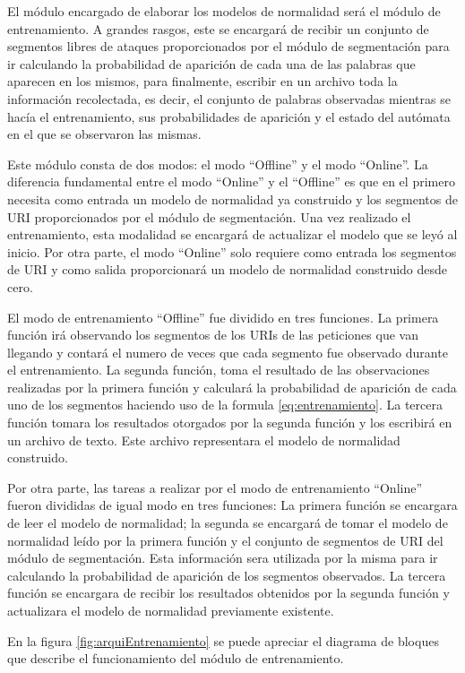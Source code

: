 El módulo encargado de elaborar los modelos de normalidad será el módulo de entrenamiento. A grandes rasgos, este se encargará de recibir un conjunto de segmentos libres de ataques proporcionados por el módulo de segmentación para ir calculando la probabilidad de aparición de cada una de las palabras que aparecen en los mismos, para finalmente, escribir en un archivo toda la información recolectada, es decir, el conjunto de palabras observadas mientras se hacía el entrenamiento, sus probabilidades de aparición y el estado del autómata en el que se observaron las mismas.

Este módulo consta de dos modos: el modo ``Offline'' y el modo ``Online''. La  diferencia fundamental entre el modo ``Online'' y el ``Offline'' es que en el primero necesita como entrada un modelo de normalidad ya construido y los segmentos de URI proporcionados por el módulo de segmentación. Una vez realizado el entrenamiento, esta modalidad se encargará de actualizar el modelo que se leyó al inicio. Por otra parte, el modo ``Online'' solo requiere como entrada los segmentos de URI y como salida proporcionará un  modelo de normalidad construido desde cero.

El modo de entrenamiento ``Offline'' fue dividido en tres funciones. La primera función irá observando los segmentos de los URIs de las peticiones que van llegando y contará el numero de veces que cada segmento fue observado durante el entrenamiento. La segunda función, toma el resultado de las observaciones realizadas por la primera función y calculará la probabilidad de aparición de cada uno de los segmentos haciendo uso de la formula \ref{eq:entrenamiento}. La tercera función tomara los resultados otorgados por la segunda función y los escribirá en un archivo de texto. Este archivo representara el modelo de normalidad construido.

Por otra parte, las tareas a realizar por el modo de entrenamiento ``Online'' fueron divididas de igual modo en tres funciones: La primera función se encargara de leer el modelo de normalidad; la segunda se encargará de tomar el modelo de normalidad leído por la primera función y el conjunto de segmentos de URI del módulo de segmentación. Esta información sera utilizada por la misma para ir calculando la probabilidad de aparición de los segmentos observados. La tercera función se encargara de recibir los resultados obtenidos por la segunda función y actualizara el modelo de normalidad previamente existente.

En la figura \ref{fig:arquiEntrenamiento} se puede apreciar el diagrama de bloques que describe el funcionamiento del módulo de entrenamiento.

